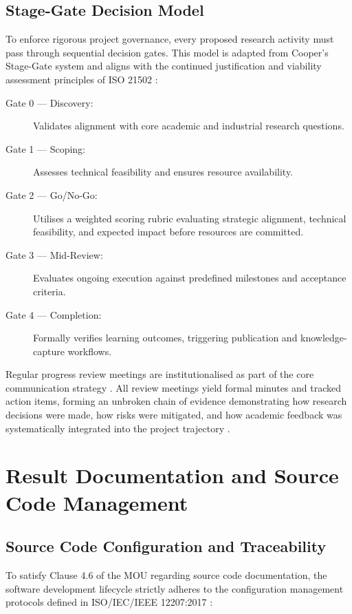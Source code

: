 \documentclass[11pt, a4paper]{article}
\begin{document}
\subsection{Stage-Gate Decision Model}

To enforce rigorous project governance, every proposed research activity must pass through sequential decision gates. This model is adapted from Cooper's Stage-Gate system \cite{cooper2010stage, cooper2017idea} and aligns with the continued justification and viability assessment principles of ISO 21502 \cite{iso21502_2020}:
\begin{description}
    \item[Gate 0 --- Discovery:] Validates alignment with core academic and industrial research questions.
    \item[Gate 1 --- Scoping:] Assesses technical feasibility and ensures resource availability.
    \item[Gate 2 --- Go/No-Go:] Utilises a weighted scoring rubric evaluating strategic alignment, technical feasibility, and expected impact before resources are committed.
    \item[Gate 3 --- Mid-Review:] Evaluates ongoing execution against predefined milestones and acceptance criteria.
    \item[Gate 4 --- Completion:] Formally verifies learning outcomes, triggering publication and knowledge-capture workflows.
\end{description}

Regular progress review meetings are institutionalised as part of the core communication strategy \cite{iso21502_2020}. All review meetings yield formal minutes and tracked action items, forming an unbroken chain of evidence demonstrating how research decisions were made, how risks were mitigated, and how academic feedback was systematically integrated into the project trajectory \cite[Sec. 4.4.2 \& 9.3.3]{iso9001_2015}.


\section{Result Documentation and Source Code Management}\label{sec:docs}

\subsection{Source Code Configuration and Traceability}

To satisfy Clause 4.6 of the MOU regarding source code documentation, the software development lifecycle strictly adheres to the configuration management protocols defined in ISO/IEC/IEEE 12207:2017 \cite{iso_iec_ieee_12207_2017}:
\end{document}

